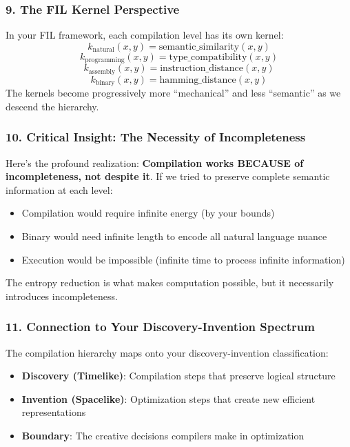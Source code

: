 \documentclass[11pt,letterpaper]{article}
\begin{document}
\subsubsection*{9. The FIL Kernel Perspective}
In your FIL framework, each compilation level has its own kernel:
\[
k_{\text{natural}}(x,y) = \text{semantic\_similarity}(x,y)
\]
\[
k_{\text{programming}}(x,y) = \text{type\_compatibility}(x,y)
\]
\[
k_{\text{assembly}}(x,y) = \text{instruction\_distance}(x,y)
\]
\[
k_{\text{binary}}(x,y) = \text{hamming\_distance}(x,y)
\]
The kernels become progressively more “mechanical” and less “semantic” as we descend the hierarchy.

\subsubsection*{10. Critical Insight: The Necessity of Incompleteness}
Here’s the profound realization: \textbf{Compilation works BECAUSE of incompleteness, not despite it}. If we tried to preserve complete semantic information at each level:
\begin{itemize}
    \item Compilation would require infinite energy (by your bounds)
    \item Binary would need infinite length to encode all natural language nuance
    \item Execution would be impossible (infinite time to process infinite information)
\end{itemize}
The entropy reduction is what makes computation possible, but it necessarily introduces incompleteness.

\subsubsection*{11. Connection to Your Discovery-Invention Spectrum}
The compilation hierarchy maps onto your discovery-invention classification:
\begin{itemize}
    \item \textbf{Discovery (Timelike)}: Compilation steps that preserve logical structure
    \item \textbf{Invention (Spacelike)}: Optimization steps that create new efficient representations
    \item \textbf{Boundary}: The creative decisions compilers make in optimization
\end{itemize}
\end{document}
